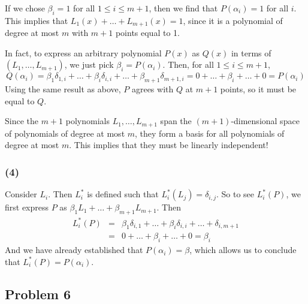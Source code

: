\documentclass{article}
\begin{document}


If we chose $\beta_i = 1$ for all $1 \leq i \leq m+1$, then we find that
$P(\alpha_i) = 1$ for all $i$. This implies that $L_1(x) + \dots + L_{m+1}(x) =
1$, since it is a polynomial of degree at most $m$ with $m+1$ points equal to 1.

In fact, to express an arbitrary polynomial $P(x)$ as $Q(x)$ in terms of
$(L_1,\dots,L_{m+1})$, we just pick $\beta_i = P(\alpha_i)$.
Then, for all $1 \leq i \leq m+1$,
\[Q(\alpha_i) = \beta_1 \delta_{1,i} + \dots + \beta_i \delta_{i,i} + \dots +
\beta_{m+1} \delta_{m+1,i} = 0 + \dots + \beta_i + \dots + 0 = P(\alpha_i)\]
Using the same result as above, $P$ agrees with $Q$ at $m+1$ points, so it must
be equal to $Q$.

Since the $m+1$ polynomials $L_1,\dots,L_{m+1}$ span the $(m+1)$-dimensional
space of polynomials of degree at most $m$, they form a basis for all
polynomials of degree at most $m$. This implies that they must be linearly
independent!

\subsubsection{(4)}
Consider $L_i$. Then $L_i^*$ is defined such that $L_i^*(L_j) = \delta_{i,j}$.
So to see $L_i^*(P)$, we first express $P$ as $\beta_1 L_1 + \dots + \beta_{m+1}
L_{m+1}$.
Then 
\begin{eqnarray*}
L_i^*(P) &=& \beta_1 \delta_{i,1} + \dots + \beta_i \delta_{i,i} + \dots + \delta_{i,m+1} \\
 &=& 0 + \dots + \beta_i + \dots + 0 = \beta_i
\end{eqnarray*}
And we have already established that $P(\alpha_i) = \beta$, which allows us to
conclude that $L_i^*(P) = P(\alpha_i)$.

\subsection{Problem 6}
\end{document}
